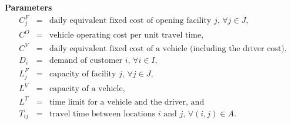 \documentclass[11pt]{article}
\begin{document}
{\bf Parameters}
\begin{eqnarray*}
C^F_j & = & \mbox{daily equivalent fixed cost of opening facility $j$, $\forall j \in J$,} \\
C^O & = & \mbox{vehicle operating cost per unit travel time,} \\
C^V & = & \mbox{daily equivalent fixed cost of a vehicle (including the driver cost),} \\
D_i & = & \mbox{demand of customer $i$, $\forall i \in I$,} \\
L^F_j & = & \mbox{capacity of facility $j$, $\forall j \in J$,} \\
L^V & = & \mbox{capacity of a vehicle,} \\
L^T & = & \mbox{time limit for a vehicle and the driver, and} \\
T_{ij} & = & \mbox{travel time between locations $i$ and $j$, $\forall (i,j) \in A$.} 
\end{eqnarray*}
\end{document}
